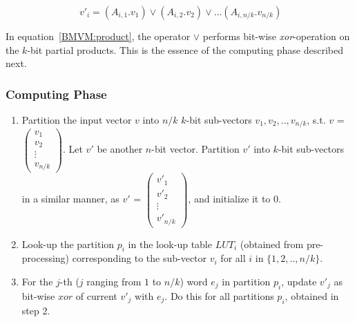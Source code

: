 \documentclass[conference, 9pt]{IEEEtran}
\begin{document}
\begin{equation}~\label{BMVM:product}
	v'_{i} = (A_{i,1}.v_1) \vee (A_{i,2}.v_2) \vee ... (A_{i,n/k}.v_{n/k}) 
\end{equation}

In equation~\ref{BMVM:product}, the operator $\vee$ performs bit-wise \emph{xor}-operation on the
$k$-bit partial products. This is the essence of the computing phase described next.\\

\subsubsection{Computing Phase}

\begin{enumerate}
	\item Partition the input vector $v$ into $n/k$ $k$-bit sub-vectors $v_1, v_2, .. , v_{n/k}$, s.t. $v$ = $\begin{pmatrix}
    v_1 \\
    v_2 \\
    \vdots \\
    v_{n/k}
\end{pmatrix}$. Let $v'$ be another $n$-bit vector. Partition $v'$ into $k$-bit sub-vectors in a similar manner, as $v'$ = $\begin{pmatrix}
    v'_1 \\
    v'_2 \\
    \vdots \\
    v'_{n/k}
\end{pmatrix}$, and initialize it to $0$. 
    \item Look-up the partition $p_i$ in the look-up table $LUT_i$ (obtained from pre-processing)
    corresponding to the sub-vector $v_i$ for all $i$ in $\{1, 2, .., n/k\}$.  
    \item For the $j$-th
        ($j$ ranging from $1$ to $n/k$) word $e_j$ in partition $p_i$, update $v'_j$ as bit-wise
        $xor$ of current $v'_j$ with $e_j$. Do this for all partitions $p_i$, obtained in step 2.

\end{enumerate}
\end{document}
